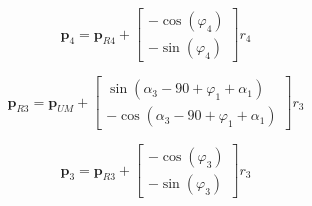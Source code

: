 \documentclass[10pt,a4paper]{article}
\begin{document}
\begin{multicols}{2}
\begin{equation}
\bm{p}_{4} = \bm{p}_{R4} + \begin{bmatrix} 
-\cos(\varphi_4) \\
-\sin(\varphi_4)\end{bmatrix} r_4
\end{equation}

\begin{equation}
\bm{p}_{R3} = \bm{p}_{UM} + \begin{bmatrix} 
\sin(\alpha_3 - 90 + \varphi_1 + \alpha_1) \\
 - \cos(\alpha_3 - 90 + \varphi_1 + \alpha_1) \end{bmatrix} r_3
\end{equation}

\begin{equation}
\bm{p}_{3} = \bm{p}_{R3} + \begin{bmatrix} 
- \cos(\varphi_3)\\
- \sin(\varphi_3)\end{bmatrix}r_3
\label{eq:F1_end}
\end{equation}

\end{multicols}
\end{document}
